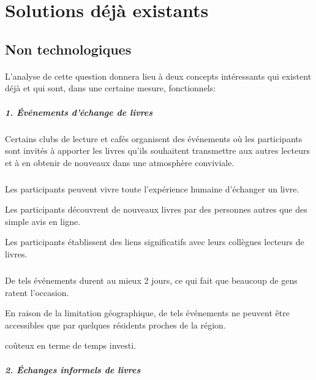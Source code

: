 \section{Solutions déjà existants}

\subsection{Non technologiques}

\paragraph*{}
L'analyse de cette question donnera lieu à deux concepts intéressants qui existent déjà et qui sont, dans une certaine mesure, fonctionnels:

\subparagraph{{\large 1. Événements d'échange de livres}\medskip\\}

Certains clubs de lecture et cafés organisent des événements où les participants sont invités à apporter les livres qu'ils souhaitent transmettre aux autres lecteurs et à en obtenir de nouveaux dans une atmosphère conviviale.

\subparagraph*{}
\begin{list}{•}{\textbf{Avantages}}
	\item Les participants peuvent vivre toute l'expérience humaine d'échanger un livre.
	\item Les participants découvrent de nouveaux livres par des personnes autres que des simple avis en ligne.
	\item Les participants établissent des liens significatifs avec leurs collègues lecteurs de livres.
\end{list}

\subparagraph*{}
\begin{list}{•}{\textbf{Inconvénients}}
	\item De tels événements durent au mieux 2 jours, ce qui fait que beaucoup de gens ratent l'occasion.
	\item En raison de la limitation géographique, de tels événements ne peuvent être accessibles que par quelques résidents proches de la région.
	\item coûteux en terme de temps investi.
\end{list}

\newpage

\subparagraph{{\large 2. Échanges informels de livres}\medskip\\}

